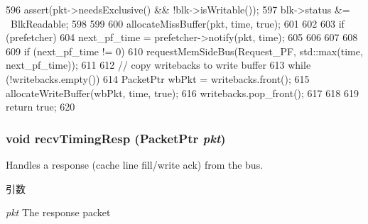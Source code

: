 \begin{DoxyCode}
{{{{{596                     assert(pkt->needsExclusive() && !blk->isWritable());
597                     blk->status &= ~BlkReadable;
598                 }
599 
600                 allocateMissBuffer(pkt, time, true);
601             }
602 
603             if (prefetcher) {
604                 next_pf_time = prefetcher->notify(pkt, time);
605             }
606         }
607     }
608 
609     if (next_pf_time != 0)
610         requestMemSideBus(Request_PF, std::max(time, next_pf_time));
611 
612     // copy writebacks to write buffer
613     while (!writebacks.empty()) {
614         PacketPtr wbPkt = writebacks.front();
615         allocateWriteBuffer(wbPkt, time, true);
616         writebacks.pop_front();
617     }
618 
619     return true;
620 }
\end{DoxyCode}
\hypertarget{classCache_a083c4da6cf866d660a126f4174bba7fc}{
\subsubsection[{recvTimingResp}]{\setlength{\rightskip}{0pt plus 5cm}void recvTimingResp ({\bf PacketPtr} {\em pkt})}}
\label{classCache_a083c4da6cf866d660a126f4174bba7fc}
Handles a response (cache line fill/write ack) from the bus. 
\begin{DoxyParams}{引数}
\item[{\em pkt}]The response packet \end{DoxyParams}



